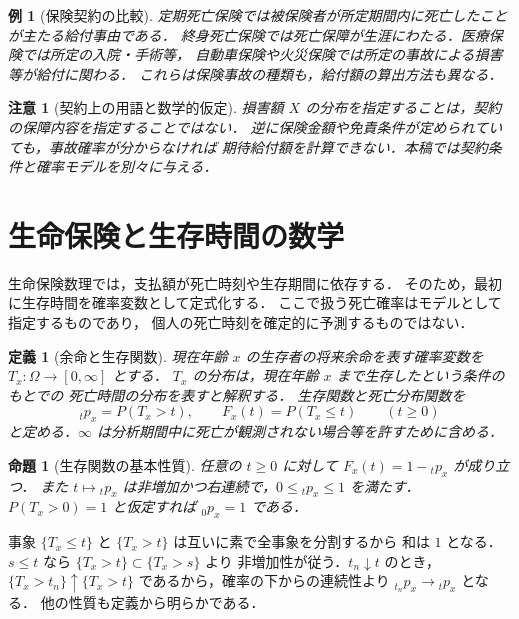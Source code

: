 \documentclass[a5paper,10pt,onecolumn]{jsarticle}
\makeatletter
\theoremstyle{mathnotetheorem}
\newtheorem{definition}[theorem]{定義}
\newtheorem{proposition}[theorem]{命題}
\newtheorem{example}[theorem]{例}
\newtheorem{remark}[theorem]{注意}
\renewcommand{\proofname}{証明}
\renewenvironment{proof}[1][\proofname]{%
  \par\pushQED{\qed}\normalfont\topsep4\p@\@plus2\p@\relax
  \trivlist\item[\hskip\labelsep\bfseries #1]\ignorespaces
}{\popQED\endtrivlist\@endpefalse}
\makeatother
\begin{document}
\begin{example}[保険契約の比較]
定期死亡保険では被保険者が所定期間内に死亡したことが主たる給付事由である．
終身死亡保険では死亡保障が生涯にわたる．医療保険では所定の入院・手術等，
自動車保険や火災保険では所定の事故による損害等が給付に関わる．
これらは保険事故の種類も，給付額の算出方法も異なる．
\end{example}

\begin{remark}[契約上の用語と数学的仮定]
損害額 $X$ の分布を指定することは，契約の保障内容を指定することではない．
逆に保険金額や免責条件が定められていても，事故確率が分からなければ
期待給付額を計算できない．本稿では契約条件と確率モデルを別々に与える．
\end{remark}

\section{生命保険と生存時間の数学}

生命保険数理では，支払額が死亡時刻や生存期間に依存する．
そのため，最初に生存時間を確率変数として定式化する．
ここで扱う死亡確率はモデルとして指定するものであり，
個人の死亡時刻を確定的に予測するものではない．

\begin{definition}[余命と生存関数]
現在年齢 $x$ の生存者の将来余命を表す確率変数を
$T_x:\Omega\to[0,\infty]$ とする．
$T_x$ の分布は，現在年齢 $x$ まで生存したという条件のもとでの
死亡時間の分布を表すと解釈する．
\emph{生存関数}と\emph{死亡分布関数}を
\[
 {}_tp_x=P(T_x>t),\qquad
 F_x(t)=P(T_x\le t)\qquad(t\ge0)
\]
と定める．$\infty$ は分析期間中に死亡が観測されない場合等を許すために含める．
\end{definition}

\begin{proposition}[生存関数の基本性質]\label{prop:surv}
任意の $t\ge0$ に対して $F_x(t)=1-{}_tp_x$ が成り立つ．
また $t\mapsto{}_tp_x$ は非増加かつ右連続で，$0\le{}_tp_x\le1$ を満たす．
$P(T_x>0)=1$ と仮定すれば ${}_0p_x=1$ である．
\end{proposition}
\begin{proof}
事象 $\{T_x\le t\}$ と $\{T_x>t\}$ は互いに素で全事象を分割するから
和は $1$ となる．$s\le t$ なら $\{T_x>t\}\subset\{T_x>s\}$ より
非増加性が従う．$t_n\downarrow t$ のとき，
$\{T_x>t_n\}\uparrow\{T_x>t\}$ であるから，確率の下からの連続性より
${}_{t_n}p_x\to{}_tp_x$ となる．
他の性質も定義から明らかである．\end{proof}
\end{document}
